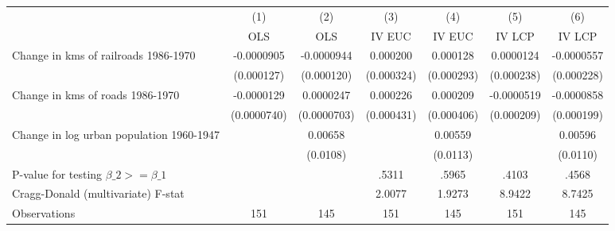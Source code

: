 {
\def\sym#1{\ifmmode^{#1}\else\(^{#1}\)\fi}
\begin{tabular}{l*{6}{c}}
\hline\hline
                &\multicolumn{1}{c}{(1)}&\multicolumn{1}{c}{(2)}&\multicolumn{1}{c}{(3)}&\multicolumn{1}{c}{(4)}&\multicolumn{1}{c}{(5)}&\multicolumn{1}{c}{(6)}\\
                &\multicolumn{1}{c}{OLS}&\multicolumn{1}{c}{OLS}&\multicolumn{1}{c}{IV EUC}&\multicolumn{1}{c}{IV EUC}&\multicolumn{1}{c}{IV LCP}&\multicolumn{1}{c}{IV LCP}\\
\hline
Change in kms of railroads 1986-1970&-0.0000905         &-0.0000944         & 0.000200         & 0.000128         &0.0000124         &-0.0000557         \\
                &(0.000127)         &(0.000120)         &(0.000324)         &(0.000293)         &(0.000238)         &(0.000228)         \\
[1em]
Change in kms of roads 1986-1970&-0.0000129         &0.0000247         & 0.000226         & 0.000209         &-0.0000519         &-0.0000858         \\
                &(0.0000740)         &(0.0000703)         &(0.000431)         &(0.000406)         &(0.000209)         &(0.000199)         \\
[1em]
Change in log urban population 1960-1947&                  &  0.00658         &                  &  0.00559         &                  &  0.00596         \\
                &                  & (0.0108)         &                  & (0.0113)         &                  & (0.0110)         \\
\hline
P-value for testing $\beta\_{2} >= \beta\_{1}$&                  &                  &    .5311         &    .5965         &    .4103         &    .4568         \\
Cragg-Donald (multivariate) F-stat&                  &                  &   2.0077         &   1.9273         &   8.9422         &   8.7425         \\
Observations    &      151         &      145         &      151         &      145         &      151         &      145         \\
\hline\hline
\end{tabular}
}
